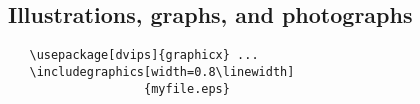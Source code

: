 \documentclass[10pt,twocolumn,letterpaper]{article}
\begin{document}
\subsection{Illustrations, graphs, and photographs}

{\small\begin{verbatim}
   \usepackage[dvips]{graphicx} ...
   \includegraphics[width=0.8\linewidth]
                   {myfile.eps}
\end{verbatim}
}


{\small


}
\end{document}
